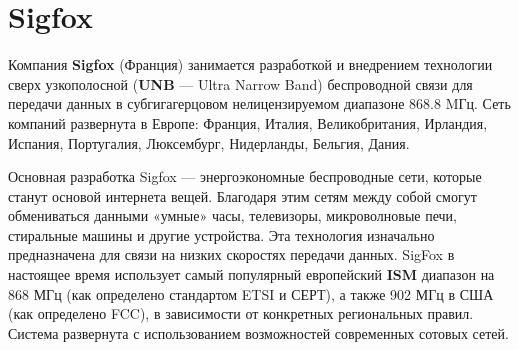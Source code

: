 \section{Sigfox}

Компания \textbf{Sigfox} (Франция) занимается разработкой и внедрением технологии сверх узкополосной (\textbf{UNB} — Ultra Narrow Band) беспроводной связи для передачи данных в субгигагерцовом нелицензируемом диапазоне 868.8 MГц. Сеть компаний развернута в Европе: Франция, Италия, Великобритания, Ирландия, Испания, Португалия, Люксембург, Нидерланды, Бельгия, Дания. 

Основная разработка Sigfox — энергоэкономные беспроводные сети, которые станут основой интернета вещей. Благодаря этим сетям между собой смогут обмениваться данными «умные» часы, телевизоры, микроволновые печи, стиральные машины и другие устройства. Эта технология изначально предназначена для связи на низких скоростях передачи данных. SigFox в настоящее время использует самый популярный европейский \textbf{ISM} диапазон на 868 МГц (как определено стандартом ETSI и СЕРТ), а также 902 МГц в США (как определено FCC), в зависимости от конкретных региональных правил. Система развернута с использованием возможностей современных сотовых сетей.

